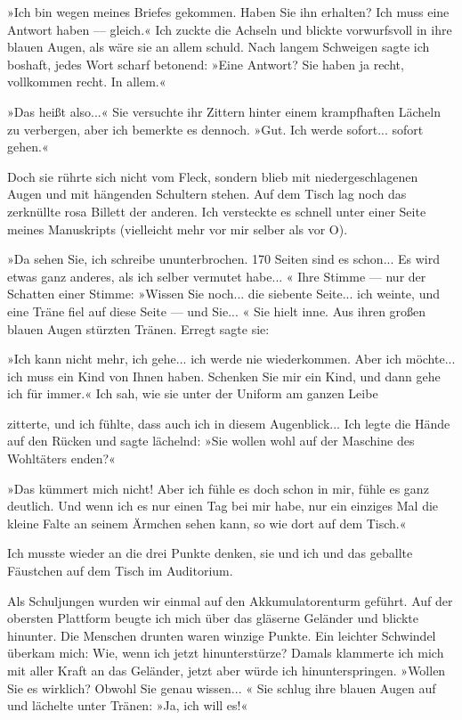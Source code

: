 »Ich bin wegen meines Briefes gekommen. Haben Sie ihn erhalten? Ich
muss eine Antwort haben — gleich.« Ich zuckte die Achseln und
blickte vorwurfsvoll in ihre blauen Augen, als wäre sie an allem
schuld. Nach langem Schweigen sagte ich boshaft, jedes Wort scharf
betonend: »Eine Antwort? Sie haben ja recht, vollkommen recht. In
allem.«

»Das heißt also...« Sie versuchte ihr Zittern hinter einem
krampfhaften Lächeln zu verbergen, aber ich bemerkte es dennoch.
»Gut. Ich werde sofort... sofort gehen.«

Doch sie rührte sich nicht vom Fleck, sondern blieb mit
niedergeschlagenen Augen und mit hängenden Schultern stehen. Auf
dem Tisch lag noch das zerknüllte rosa Billett der anderen. Ich
versteckte es schnell unter einer Seite meines Manuskripts
(vielleicht mehr vor mir selber als vor O).

»Da sehen Sie, ich schreibe ununterbrochen. 170 Seiten sind es
schon... Es wird etwas ganz anderes, als ich selber vermutet
habe... « Ihre Stimme — nur der Schatten einer Stimme: »Wissen Sie
noch... die siebente Seite... ich weinte, und eine Träne fiel auf
diese Seite — und Sie... « Sie hielt inne. Aus ihren großen blauen
Augen stürzten Tränen. Erregt sagte sie:

»Ich kann nicht mehr, ich gehe... ich werde nie wiederkommen. Aber
ich möchte... ich muss ein Kind von Ihnen haben. Schenken Sie mir
ein Kind, und dann gehe ich für immer.« Ich sah, wie sie unter der
Uniform am ganzen Leibe

zitterte, und ich fühlte, dass auch ich in diesem Augenblick... Ich
legte die Hände auf den Rücken und sagte lächelnd: »Sie wollen wohl
auf der Maschine des Wohltäters enden?«

»Das kümmert mich nicht! Aber ich fühle es doch schon in mir, fühle
es ganz deutlich. Und wenn ich es nur einen Tag bei mir habe, nur
ein einziges Mal die kleine Falte an seinem Ärmchen sehen kann, so
wie dort auf dem Tisch.«

Ich musste wieder an die drei Punkte denken, sie und ich und das
geballte Fäustchen auf dem Tisch im Auditorium.

Als Schuljungen wurden wir einmal auf den Akkumulatorenturm
geführt. Auf der obersten Plattform beugte ich mich über das
gläserne Geländer und blickte hinunter. Die Menschen drunten waren
winzige Punkte. Ein leichter Schwindel überkam mich: Wie, wenn ich
jetzt hinunterstürze? Damals klammerte ich mich mit aller Kraft an
das Geländer, jetzt aber würde ich hinunterspringen. »Wollen Sie es
wirklich? Obwohl Sie genau wissen... « Sie schlug ihre blauen Augen
auf und lächelte unter Tränen: »Ja, ich will es!«


